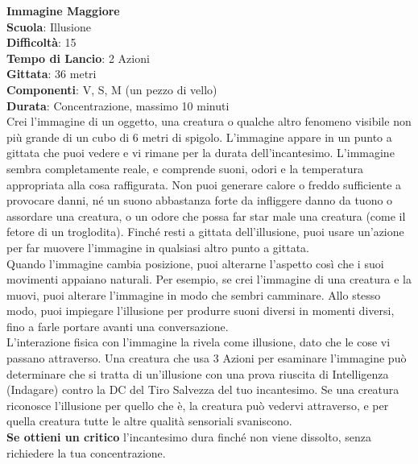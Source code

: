 \begin{multicols}{2}
\medskip\textbf{Immagine Maggiore}\\
\textbf{Scuola}: Illusione\\
\textbf{Difficoltà}: 15\\
\textbf{Tempo di Lancio}: 2 Azioni\\
\textbf{Gittata}: 36 metri\\
\textbf{Componenti}: V, S, M (un pezzo di vello)\\
\textbf{Durata}: Concentrazione, massimo 10 minuti\\
Crei l'immagine di un oggetto, una creatura o qualche altro fenomeno visibile non più grande di un cubo di 6 metri di spigolo. L'immagine appare in un punto a gittata che puoi vedere e vi rimane per la durata dell'incantesimo. L'immagine sembra completamente reale, e comprende suoni, odori e la temperatura appropriata alla cosa raffigurata. Non puoi generare calore o freddo sufficiente a provocare danni, né un suono abbastanza forte da infliggere danno da tuono o assordare una creatura, o un odore che possa far star male una creatura (come il fetore di un troglodita). Finché resti a gittata dell'illusione, puoi usare un'azione per far muovere l'immagine in qualsiasi altro punto a gittata.\\
Quando l'immagine cambia posizione, puoi alterarne l'aspetto così che i suoi movimenti appaiano naturali. Per esempio, se crei l'immagine di una creatura e la muovi, puoi alterare l'immagine in modo che sembri camminare. Allo stesso modo, puoi impiegare l'illusione per produrre suoni diversi in momenti diversi, fino a farle portare avanti una conversazione.\\
L'interazione fisica con l'immagine la rivela come illusione, dato che le cose vi passano attraverso. Una creatura che usa 3 Azioni per esaminare l'immagine può determinare che si tratta di un'illusione con una prova riuscita di Intelligenza (Indagare) contro la DC del Tiro Salvezza del tuo incantesimo. Se una creatura riconosce l'illusione per quello che è, la creatura può vedervi attraverso, e per quella creatura tutte le altre qualità sensoriali svaniscono.\\
\textbf{Se ottieni un critico} l'incantesimo dura finché non viene dissolto, senza richiedere la tua concentrazione.
	

\end{multicols}
